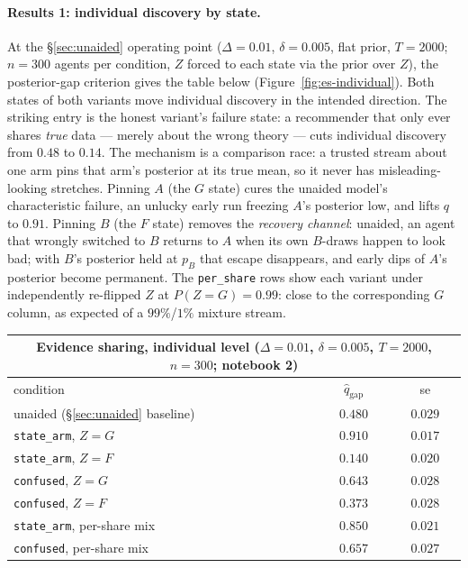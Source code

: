 \documentclass[12pt]{article}
\begin{document}
\paragraph{Results 1: individual discovery by state.}
At the \S\ref{sec:unaided} operating point ($\Delta = 0.01$, $\delta = 0.005$, flat prior, $T = 2000$; $n = 300$ agents per condition, $Z$ forced to each state via the prior over $Z$), the posterior-gap criterion gives the table below (Figure~\ref{fig:es-individual}). Both states of both variants move individual discovery in the intended direction. The striking entry is the honest variant's failure state: a recommender that only ever shares \emph{true} data --- merely about the wrong theory --- cuts individual discovery from $0.48$ to $0.14$. The mechanism is a comparison race: a trusted stream about one arm pins that arm's posterior at its true mean, so it never has misleading-looking stretches. Pinning $A$ (the $G$ state) cures the unaided model's characteristic failure, an unlucky early run freezing $A$'s posterior low, and lifts $q$ to $0.91$. Pinning $B$ (the $F$ state) removes the \emph{recovery channel}: unaided, an agent that wrongly switched to $B$ returns to $A$ when its own $B$-draws happen to look bad; with $B$'s posterior held at $p_B$ that escape disappears, and early dips of $A$'s posterior become permanent. The \texttt{per\_share} rows show each variant under independently re-flipped $Z$ at $P(Z = G) = 0.99$: close to the corresponding $G$ column, as expected of a $99\%$/$1\%$ mixture stream.

\begin{center}
\small
\begin{tabular}{lcc}
\toprule
\multicolumn{3}{c}{\textbf{Evidence sharing, individual level} \quad ($\Delta = 0.01$, $\delta = 0.005$, $T = 2000$, $n = 300$; notebook 2)}\\
\midrule
condition & $\hat q_{\text{gap}}$ & se\\
\midrule
unaided (\S\ref{sec:unaided} baseline) & $0.480$ & $0.029$\\
\texttt{state\_arm}, $Z = G$ & $0.910$ & $0.017$\\
\texttt{state\_arm}, $Z = F$ & $0.140$ & $0.020$\\
\texttt{confused}, $Z = G$ & $0.643$ & $0.028$\\
\texttt{confused}, $Z = F$ & $0.373$ & $0.028$\\
\texttt{state\_arm}, per-share mix & $0.850$ & $0.021$\\
\texttt{confused}, per-share mix & $0.657$ & $0.027$\\
\bottomrule
\end{tabular}
\end{center}
\end{document}
